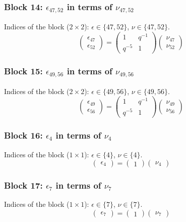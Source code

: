 \subsubsection{Block 14: $\epsilon_{47, 52}$ in terms of $\nu_{47, 52}$}
Indices of the block ($2\times 2$): $\epsilon \in \{47, 52\}$, $\nu \in \{47, 52\}$.
\[
\begin{pmatrix}
\epsilon_{47} \\
\epsilon_{52}
\end{pmatrix}
=
\begin{pmatrix}
1 & q^{-1} \\
q^{-5} & 1
\end{pmatrix}
\begin{pmatrix}
\nu_{47} \\
\nu_{52}
\end{pmatrix}
\]

\subsubsection{Block 15: $\epsilon_{49, 56}$ in terms of $\nu_{49, 56}$}
Indices of the block ($2\times 2$): $\epsilon \in \{49, 56\}$, $\nu \in \{49, 56\}$.
\[
\begin{pmatrix}
\epsilon_{49} \\
\epsilon_{56}
\end{pmatrix}
=
\begin{pmatrix}
1 & q^{-1} \\
q^{-5} & 1
\end{pmatrix}
\begin{pmatrix}
\nu_{49} \\
\nu_{56}
\end{pmatrix}
\]

\subsubsection{Block 16: $\epsilon_{4}$ in terms of $\nu_{4}$}
Indices of the block ($1\times 1$): $\epsilon \in \{4\}$, $\nu \in \{4\}$.
\[
\begin{pmatrix}
\epsilon_{4}
\end{pmatrix}
=
\begin{pmatrix}
1
\end{pmatrix}
\begin{pmatrix}
\nu_{4}
\end{pmatrix}
\]

\subsubsection{Block 17: $\epsilon_{7}$ in terms of $\nu_{7}$}
Indices of the block ($1\times 1$): $\epsilon \in \{7\}$, $\nu \in \{7\}$.
\[
\begin{pmatrix}
\epsilon_{7}
\end{pmatrix}
=
\begin{pmatrix}
1
\end{pmatrix}
\begin{pmatrix}
\nu_{7}
\end{pmatrix}
\]


